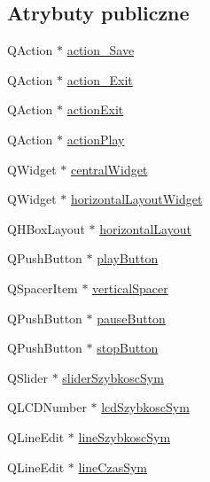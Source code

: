 \subsection*{Atrybuty publiczne}
\begin{DoxyCompactItemize}
\item 
Q\+Action $\ast$ \hyperlink{class_ui___d_main_window_a7ab98279e07bdd724a091ea06012c87b}{action\+\_\+\+Save}
\item 
Q\+Action $\ast$ \hyperlink{class_ui___d_main_window_a00e6b795743b676bdf3ed853e91f7029}{action\+\_\+\+Exit}
\item 
Q\+Action $\ast$ \hyperlink{class_ui___d_main_window_ae1fa62a4d27fa0f4a5c63c7c60cfdad2}{action\+Exit}
\item 
Q\+Action $\ast$ \hyperlink{class_ui___d_main_window_a6cfb6311ca1dd6e247d80255e2667ba7}{action\+Play}
\item 
Q\+Widget $\ast$ \hyperlink{class_ui___d_main_window_a94cf40cb4e645cfa2e80f36ffbf5018e}{central\+Widget}
\item 
Q\+Widget $\ast$ \hyperlink{class_ui___d_main_window_a777a56f3b74aa5b5cd5ff2c62a2968a9}{horizontal\+Layout\+Widget}
\item 
Q\+H\+Box\+Layout $\ast$ \hyperlink{class_ui___d_main_window_a4ab6ff85d8c5edef531b3f2111a04157}{horizontal\+Layout}
\item 
Q\+Push\+Button $\ast$ \hyperlink{class_ui___d_main_window_ad87cbf39ac14374923ed2a2b11e8b1bf}{play\+Button}
\item 
Q\+Spacer\+Item $\ast$ \hyperlink{class_ui___d_main_window_a476471e78bf431c7487fa9e0afadb76d}{vertical\+Spacer}
\item 
Q\+Push\+Button $\ast$ \hyperlink{class_ui___d_main_window_a70e142e35db4995a1fefa082406bdef3}{pause\+Button}
\item 
Q\+Push\+Button $\ast$ \hyperlink{class_ui___d_main_window_a1fe7797fff349a0f0d47d90c8438f386}{stop\+Button}
\item 
Q\+Slider $\ast$ \hyperlink{class_ui___d_main_window_a8d12f07935a52a597e57eddf50e5c98f}{slider\+Szybkosc\+Sym}
\item 
Q\+L\+C\+D\+Number $\ast$ \hyperlink{class_ui___d_main_window_a4eb8e2a87080f4f314eb96c52a82e39d}{lcd\+Szybkosc\+Sym}
\item 
Q\+Line\+Edit $\ast$ \hyperlink{class_ui___d_main_window_a73bafa5343a8e3cb7cd673a24be76008}{line\+Szybkosc\+Sym}
\item 
Q\+Line\+Edit $\ast$ \hyperlink{class_ui___d_main_window_aad165daf4686baecb2ccd6709c629579}{line\+Czas\+Sym}

\end{DoxyCompactItemize}
